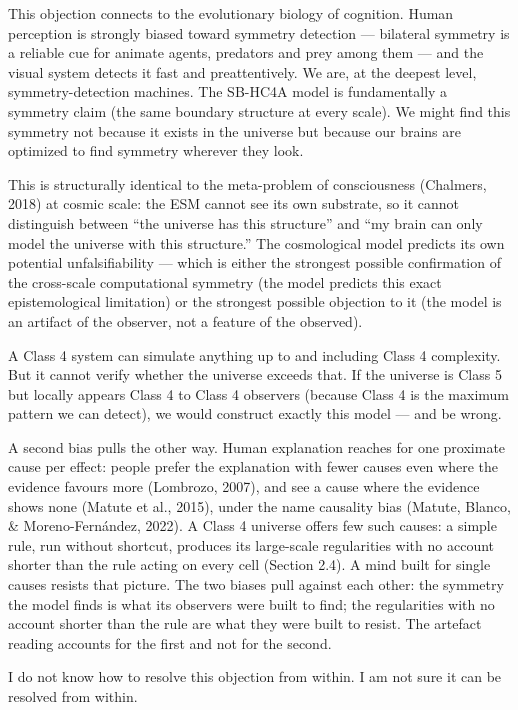 \documentclass[
]{article}
\begin{document}
This objection connects to the evolutionary biology of cognition. Human
perception is strongly biased toward symmetry detection --- bilateral
symmetry is a reliable cue for animate agents, predators and prey among
them --- and the visual system detects it fast and preattentively. We
are, at the deepest level, symmetry-detection machines. The SB-HC4A
model is fundamentally a symmetry claim (the same boundary structure at
every scale). We might find this symmetry not because it exists in the
universe but because our brains are optimized to find symmetry wherever
they look.

This is structurally identical to the meta-problem of consciousness
(Chalmers, 2018) at cosmic scale: the ESM cannot see its own substrate,
so it cannot distinguish between ``the universe has this structure'' and
``my brain can only model the universe with this structure.'' The
cosmological model predicts its own potential unfalsifiability --- which
is either the strongest possible confirmation of the cross-scale
computational symmetry (the model predicts this exact epistemological
limitation) or the strongest possible objection to it (the model is an
artifact of the observer, not a feature of the observed).

A Class 4 system can simulate anything up to and including Class 4
complexity. But it cannot verify whether the universe exceeds that. If
the universe is Class 5 but locally appears Class 4 to Class 4 observers
(because Class 4 is the maximum pattern we can detect), we would
construct exactly this model --- and be wrong.

A second bias pulls the other way. Human explanation reaches for one
proximate cause per effect: people prefer the explanation with fewer
causes even where the evidence favours more (Lombrozo, 2007), and see a
cause where the evidence shows none (Matute et al., 2015), under the
name causality bias (Matute, Blanco, \& Moreno-Fernández, 2022). A Class
4 universe offers few such causes: a simple rule, run without shortcut,
produces its large-scale regularities with no account shorter than the
rule acting on every cell (Section 2.4). A mind built for single causes
resists that picture. The two biases pull against each other: the
symmetry the model finds is what its observers were built to find; the
regularities with no account shorter than the rule are what they were
built to resist. The artefact reading accounts for the first and not for
the second.

I do not know how to resolve this objection from within. I am not sure
it can be resolved from within.
\end{document}
